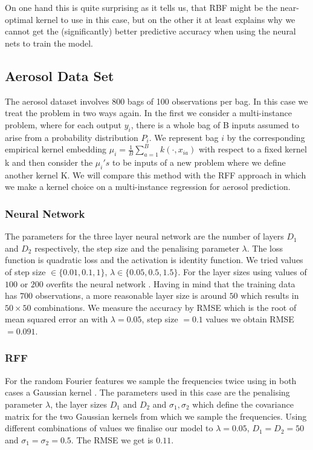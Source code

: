 \documentclass{article} %
\begin{document}
On one hand this is quite surprising as it tells us, that RBF might be the near-optimal kernel to use in this case, but on the other it at least explains why we cannot get the (significantly) better predictive accuracy when using the neural nets to train the model.


\subsection{Aerosol Data Set}
The aerosol dataset involves 800 bags of 100 observations per bag.  In this case we treat the problem in two ways again. In the first we consider a multi-instance problem, where for each output $y_{i}$, there is a whole bag of B inputs assumed to arise from a probability distribution $P_{i}$. We represent  bag $i$ by the corresponding 
empirical kernel embedding $\mu_{i} = \frac{1}{B} \sum_{a=1}^{B} k( \cdot, x_{ia})$ with respect to a fixed kernel k and then consider the $\mu_{i} 's$ to be inputs of a new problem where we define another kernel K. 
We will compare this method with the RFF approach in which we make a kernel choice on a multi-instance regression for
aerosol prediction. 
\subsubsection{Neural Network}
The parameters for the three layer neural network are the number of layers $D_1$ and $D_2$ respectively, the step size and the penalising parameter $\lambda$. The loss function is quadratic loss and the activation is identity function. We tried values of step size $\in \{  0.01, 0.1, 1\}$, $\lambda \in \{ 0.05, 0.5, 1.5 \}$. For the layer sizes using values of $100$ or $200$ overfits the neural network . Having in mind that the training data has $700$ observations, a more reasonable layer size is around $50$ which results in $50 \times 50$ combinations. We measure the accuracy by RMSE which is the root of mean squared error an with $\lambda = 0.05$, step size $ = 0.1$ values we obtain RMSE $=0.091$.
\subsubsection{ RFF}
For the random Fourier features we sample the frequencies twice using in both cases a Gaussian kernel . The parameters used in this case are the penalising parameter $\lambda$, the layer sizes $D_1$ and $D_2$ and $\sigma_1, \sigma_2$ which define the covariance matrix for the two Gaussian kernels from which we sample the frequencies. Using different combinations of values we finalise our model to $\lambda= 0.05$, $D_1=D_2=50$ and $\sigma_1=\sigma_2 = 0.5$. The RMSE we get is $0.11$.
\end{document}
